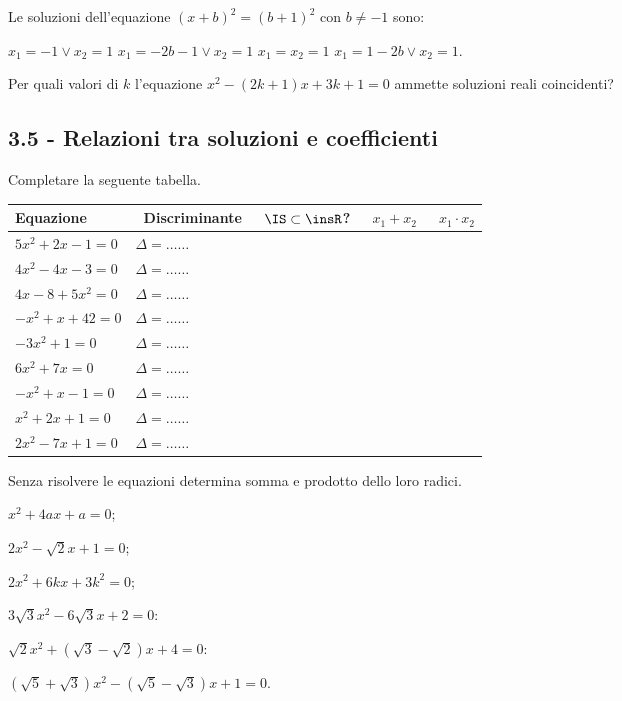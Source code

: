 \begin{esercizio}
 \label{ese:3.76}
Le soluzioni dell'equazione $(x + b)^{2} = (b + 1)^{2}$ con $b \neq-1$ sono:

\boxA \;$x_{1} =-1\vee x _{2} = 1$
\boxB \;$x_{1} =-2 b-1 \vee x_{2} = 1$
\boxC \;$x_{1} = x_{2} = 1$
\boxD \;$x_{1} = 1-2 b \vee x_{2} = 1$.
\end{esercizio}

\begin{esercizio}
 \label{ese:3.77}
Per quali valori di $k$ l'equazione $x^{2}-(2 k + 1) x + 3 k + 1=0$ ammette soluzioni reali coincidenti?
\end{esercizio}
\pagebreak
\subsection*{3.5 - Relazioni tra soluzioni e coefficienti}

\begin{esercizio}
 \label{ese:3.78}
Completare la seguente tabella.

 \begin{tabular*}{.9\textwidth}{@{\extracolsep{\fill}}*{5}{l}}
 \toprule
 Equazione &~Discriminante&~$\IS\subset\insR$? &~$x_1 + x_2$ &~$x_1 \cdot x_2$\\
\midrule
 $5 x^{2} + 2 x-1 = 0$& $\Delta=\ldots \ldots$ & &	&\\
 $4 x^{2} - 4 x-3 = 0$& $\Delta=\ldots \ldots$ & &	&\\
 $4 x -8 + 5 x^{2} = 0$& $\Delta=\ldots \ldots$ & &	&\\
 $-x^{2} + x+42 = 0$& $\Delta=\ldots \ldots$ & &	&\\
 $- 3 x^{2} + 1 = 0$&$\Delta=\ldots \ldots$ & &	&\\
 $6 x^{2} + 7 x = 0$&$\Delta=\ldots \ldots$ & &	&\\
 $- x^{2} + x-1 = 0$&$\Delta=\ldots \ldots$ & &	&\\
 $x^{2} + 2 x + 1 = 0$&$\Delta=\ldots \ldots$ & &	&\\
 $2 x^{2}-7 x + 1 = 0$&$\Delta=\ldots \ldots $ & &	&\\
\bottomrule
 \end{tabular*}
\end{esercizio}

\begin{esercizio}
 \label{ese:3.79}
Senza risolvere le equazioni determina somma e prodotto dello loro radici.
\begin{multicols}{2}
\begin{enumeratea}
\item $x^{2} + 4ax + a = 0$;
\item $2x^{2}-\sqrt{2} x + 1 = 0$;
\item $2x^{2} + 6kx + 3k^{2} = 0$;
\item $3 \sqrt{3} x^{2}-6 \sqrt{3} x + 2 = 0$:
\item $\sqrt{2} x^{2} + (\sqrt{3}-\sqrt{2}) x + 4 = 0$:
\item $(\sqrt{5} + \sqrt{3}) x^{2}-(\sqrt{5}-\sqrt{3}) x + 1= 0$.
\end{enumeratea}
\end{multicols}
\end{esercizio}


